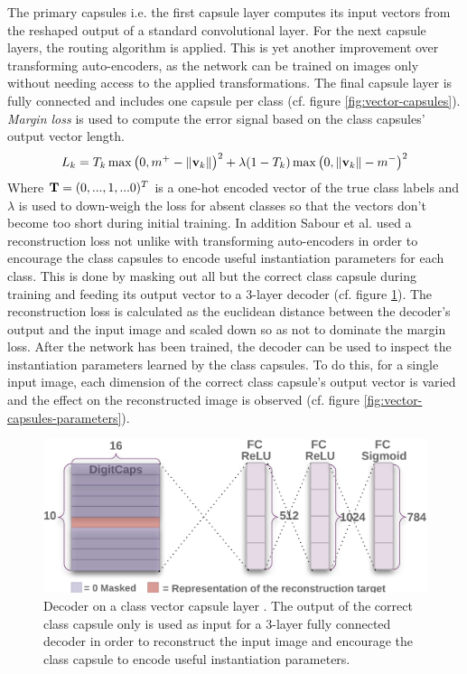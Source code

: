 The primary capsules i.e. the first capsule layer computes its input vectors from the reshaped output of a standard convolutional layer. For the next capsule layers, the routing algorithm is applied. This is yet another improvement over transforming auto-encoders, as the network can be trained on images only without needing access to the applied transformations. The final capsule layer is fully connected and includes one capsule per class (cf. figure \ref{fig:vector-capsules}). \emph{Margin loss} is used to compute the error signal based on the class capsules' output vector length.
\begin{align}
    L_k = T_k \operatorname{max}\qty(0,m^+ - \norm{\vb{v}_k})^2 + \lambda \qty(1-T_k) \operatorname{max}\qty(0, \norm{\vb{v}_k}-m^-)^2
\end{align}
Where $\vb{T} = (0,...,1,...0)^T$ is a one-hot encoded vector of the true class labels and $\lambda$ is used to down-weigh the loss for absent classes so that the vectors don't become too short during initial training. In addition Sabour et al. used a reconstruction loss not unlike with transforming auto-encoders in order to encourage the class capsules to encode useful instantiation parameters for each class. This is done by masking out all but the correct class capsule during training and feeding its output vector to a 3-layer decoder (cf. figure \ref{fig:vector-capsules-reconstr}). The reconstruction loss is calculated as the euclidean distance between the decoder's output and the input image and scaled down so as not to dominate the margin loss. After the network has been trained, the decoder can be used to inspect the instantiation parameters learned by the class capsules. To do this, for a single input image, each dimension of the correct class capsule's output vector is varied and the effect on the reconstructed image is observed (cf. figure \ref{fig:vector-capsules-parameters}).
\begin{figure}
    \centering
    \includegraphics[width=.75\textwidth]{figures/vector-capsules-reconstr.png}
\caption[Decoder on a class vector capsule layer]{Decoder on a class vector capsule layer \cite{sabour2017dynamic}. The output of the correct class capsule only is used as input for a 3-layer fully connected decoder in order to reconstruct the input image and encourage the class capsule to encode useful instantiation parameters.}\label{fig:vector-capsules-reconstr}
\end{figure}\noindent
